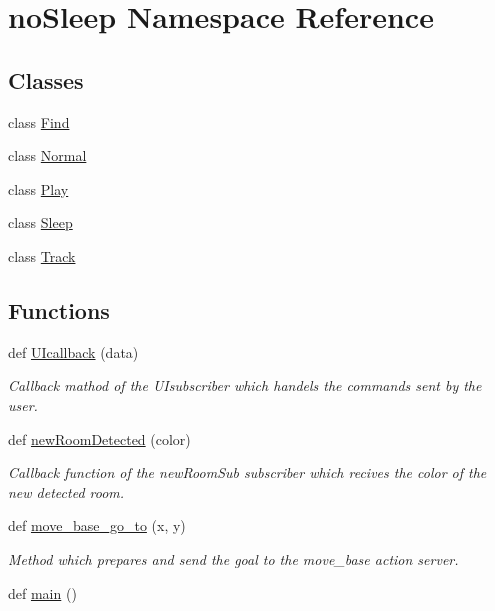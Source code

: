\hypertarget{namespacenoSleep}{}\section{no\+Sleep Namespace Reference}
\label{namespacenoSleep}
\subsection*{Classes}
\begin{DoxyCompactItemize}
\item 
class \hyperlink{classnoSleep_1_1Find}{Find}
\item 
class \hyperlink{classnoSleep_1_1Normal}{Normal}
\item 
class \hyperlink{classnoSleep_1_1Play}{Play}
\item 
class \hyperlink{classnoSleep_1_1Sleep}{Sleep}
\item 
class \hyperlink{classnoSleep_1_1Track}{Track}
\end{DoxyCompactItemize}
\subsection*{Functions}
\begin{DoxyCompactItemize}
\item 
def \hyperlink{namespacenoSleep_a123223ff9a3dbafbd97e6d0f384396a2}{U\+Icallback} (data)
\begin{DoxyCompactList}\small\item\em Callback mathod of the U\+Isubscriber which handels the commands sent by the user. \end{DoxyCompactList}\item 
def \hyperlink{namespacenoSleep_afdab4949f2266a97c8e4f22565029431}{new\+Room\+Detected} (color)
\begin{DoxyCompactList}\small\item\em Callback function of the new\+Room\+Sub subscriber which recives the color of the new detected room. \end{DoxyCompactList}\item 
def \hyperlink{namespacenoSleep_a3f9d1f6206657669b0f1e0eb03e3faf8}{move\+\_\+base\+\_\+go\+\_\+to} (x, y)
\begin{DoxyCompactList}\small\item\em Method which prepares and send the goal to the move\+\_\+base action server. \end{DoxyCompactList}\item 
def \hyperlink{namespacenoSleep_a76829f5a5ea086115d4bbc161b5de95e}{main} ()
\end{DoxyCompactItemize}
